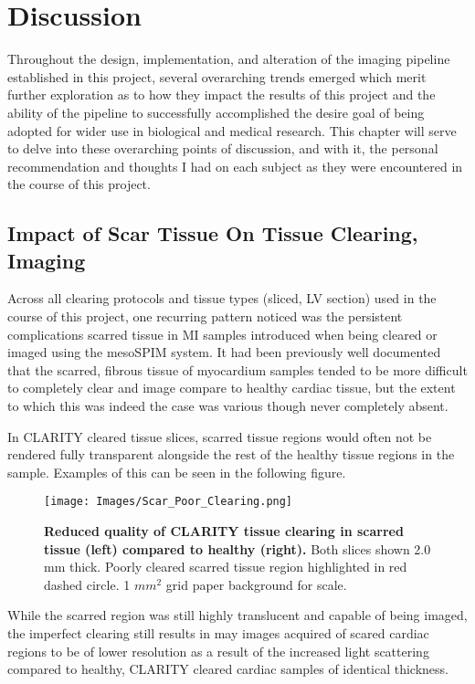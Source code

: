 \chapter{Discussion}
Throughout the design, implementation, and alteration of the imaging pipeline established in this project, several overarching trends emerged which merit further exploration as to how they impact the results of this project and the ability of the pipeline to successfully accomplished the desire goal of being adopted for wider use in biological and medical research. This chapter will serve to delve into these overarching points of discussion, and with it, the personal recommendation and thoughts I had on each subject as they were encountered in the course of  this project.
\medskip

\section{Impact of Scar Tissue On Tissue Clearing, Imaging}
Across all clearing protocols and tissue types (sliced, LV section) used in the course of this project, one recurring pattern noticed was the persistent complications scarred tissue in MI samples introduced when being cleared or imaged using the mesoSPIM system. It had been previously well documented that the scarred, fibrous tissue of myocardium samples tended to be more difficult to completely clear and image compare to healthy cardiac tissue, but the extent to which this was indeed the case was various though never completely absent. 

In CLARITY cleared tissue slices, scarred tissue regions would often not be rendered fully transparent alongside the rest of the healthy tissue regions in the sample. Examples of this can be seen in the following figure.

\begin{figure}[H]
    \centering
        \texttt{[image: Images/Scar\_Poor\_Clearing.png]}
        \caption{\textbf{Reduced quality of CLARITY tissue clearing in scarred tissue (left) compared to healthy (right).} Both slices shown 2.0 mm thick. Poorly cleared scarred tissue region highlighted in red dashed circle. 1 $mm^2$ grid paper background for scale.}
        \label{fig:enter-label}
\end{figure}

While the scarred region was still highly translucent and capable of being imaged, the imperfect clearing still results in may images acquired of scared cardiac regions to be of lower resolution as a result of the increased light scattering compared to healthy, CLARITY cleared cardiac samples of identical thickness. 

